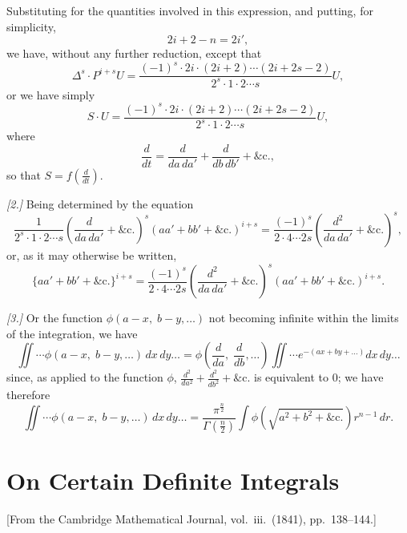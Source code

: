 \documentclass[11pt,a4paper]{book}
\begin{document}
Substituting for the quantities involved in this expression, and putting, for simplicity,
\[
2i + 2 - n = 2i',
\]
we have, without any further reduction, except that
\[
\Delta^s \cdot P^{i+s} U = \frac{(-1)^s \cdot 2i \cdot (2i+2) \cdots (2i+2s-2)}{2^s \cdot 1 \cdot 2 \cdots s} U,
\]
or we have simply
\[
S \cdot U = \frac{(-1)^s \cdot 2i \cdot (2i+2) \cdots (2i+2s-2)}{2^s \cdot 1 \cdot 2 \cdots s} U,
\]
where
\[
\frac{d}{dt} = \frac{d}{da\, da'} + \frac{d}{db\, db'} + \&\mathrm{c.},
\]
so that $S = f\left(\frac{d}{dt}\right)$.

\textit{[2.]} Being determined by the equation
\[
\frac{1}{2^s \cdot 1 \cdot 2 \cdots s} \left(\frac{d}{da\, da'} + \&\mathrm{c.}\right)^s (aa' + bb' + \&\mathrm{c.})^{i+s}
= \frac{(-1)^s}{2 \cdot 4 \cdots 2s} \left(\frac{d^2}{da\, da'} + \&\mathrm{c.}\right)^s,
\]
or, as it may otherwise be written,
\[
\{aa' + bb' + \&\mathrm{c.}\}^{i+s}
= \frac{(-1)^s}{2 \cdot 4 \cdots 2s} \left(\frac{d^2}{da\, da'} + \&\mathrm{c.}\right)^s (aa' + bb' + \&\mathrm{c.})^{i+s}.
\]

\textit{[3.]} Or the function $\phi(a-x,\; b-y,\ldots)$ not becoming infinite within the limits of the integration, we have
\[
\iint \cdots \phi(a-x,\; b-y,\ldots)\, dx\, dy \ldots
= \phi\left(\frac{d}{da},\; \frac{d}{db},\ldots\right) \iint \cdots e^{-(ax + by + \ldots)} dx\, dy \ldots
\]
since, as applied to the function $\phi$, $\frac{d^2}{da^2} + \frac{d^2}{db^2} + \&\mathrm{c.}$ is equivalent to $0$; we have therefore
\[
\iint \cdots \phi(a-x,\; b-y,\ldots)\, dx\, dy \ldots
= \frac{\pi^{\frac{n}{2}}}{\Gamma\left(\frac{n}{2}\right)} \int \phi\left(\sqrt{a^2 + b^2 + \&\mathrm{c.}}\right) r^{n-1}\, dr.
\]

\cleardoublepage

\chapter{On Certain Definite Integrals}
\label{chap:paper3}

\begin{center}
\small[From the Cambridge Mathematical Journal, vol.~iii.\ (1841), pp.~138--144.]
\end{center}

\section*{}
\end{document}
